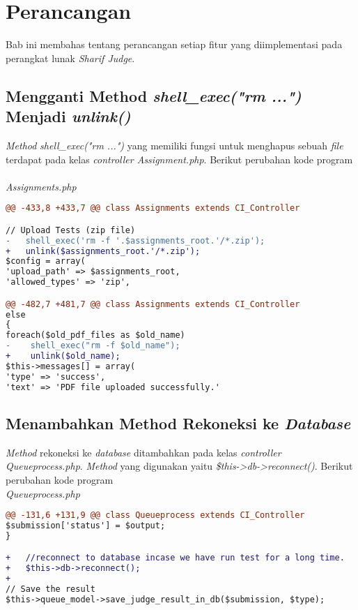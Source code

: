\chapter{Perancangan}
\label{chap:perancangan}

Bab ini membahas tentang perancangan setiap fitur yang diimplementasi pada perangkat lunak \textit{Sharif Judge}. 

\section{Mengganti Method \textit{shell\_exec("rm ...")} Menjadi \textit{unlink()}}
\textit{Method} \textit{shell\_exec("rm ...")} yang memiliki fungsi untuk menghapus sebuah \textit{file} terdapat pada kelas \textit{controller Assignment.php}. Berikut perubahan kode program
~\\
\textit{Assignments.php}
\begin{lstlisting}[language=diff, basicstyle=\ttfamily, frame=single,
columns=fullflexible, keepspaces=true]
@@ -433,8 +433,7 @@ class Assignments extends CI_Controller

// Upload Tests (zip file)
-   shell_exec('rm -f '.$assignments_root.'/*.zip');
+   unlink($assignments_root.'/*.zip');
$config = array(
'upload_path' => $assignments_root,
'allowed_types' => 'zip',

@@ -482,7 +481,7 @@ class Assignments extends CI_Controller
else
{
foreach($old_pdf_files as $old_name)
-    shell_exec("rm -f $old_name");
+    unlink($old_name);
$this->messages[] = array(
'type' => 'success',
'text' => 'PDF file uploaded successfully.'
\end{lstlisting}

\section{Menambahkan Method Rekoneksi ke \textit{Database}}
\textit{Method} rekoneksi ke \textit{database} ditambahkan pada kelas \textit{controller Queueprocess.php}. \textit{Method} yang digunakan yaitu \textit{\$this->db->reconnect()}. %
Berikut perubahan kode program
~\\
\textit{Queueprocess.php}
\begin{lstlisting}[language=diff, basicstyle=\ttfamily, frame=single,
columns=fullflexible, keepspaces=true]
@@ -131,6 +131,9 @@ class Queueprocess extends CI_Controller
$submission['status'] = $output;
}

+   //reconnect to database incase we have run test for a long time.
+   $this->db->reconnect();
+
// Save the result
$this->queue_model->save_judge_result_in_db($submission, $type);
\end{lstlisting}

